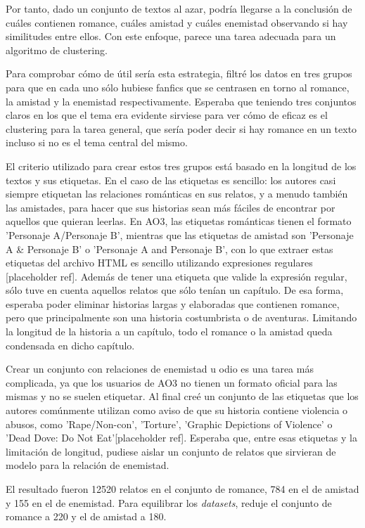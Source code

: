 \documentclass{pre-tfg}
\newcommand{\refToFilterCode}{[placeholder ref]}
\begin{document}
Por tanto, dado un conjunto de textos al azar, podría llegarse a la conclusión de cuáles contienen romance, cuáles amistad y cuáles enemistad observando si hay similitudes entre ellos. Con este enfoque, parece una tarea adecuada para un algoritmo de clustering.

Para comprobar cómo de útil sería esta estrategia, filtré los datos en tres grupos para que en cada uno sólo hubiese fanfics que se centrasen en torno al romance, la amistad y la enemistad respectivamente. Esperaba que teniendo tres conjuntos claros en los que el tema era evidente sirviese para ver cómo de eficaz es el clustering para la tarea general, que sería poder decir si hay romance en un texto incluso si no es el tema central del mismo.

El criterio utilizado para crear estos tres grupos está basado en la longitud de los textos y sus etiquetas. En el caso de las etiquetas es sencillo: los autores casi siempre etiquetan las relaciones románticas en sus relatos, y a menudo también las amistades, para hacer que sus historias sean más fáciles de encontrar por aquellos que quieran leerlas. En AO3, las etiquetas románticas tienen el formato 'Personaje A/Personaje B', mientras que las etiquetas de amistad son 'Personaje A \& Personaje B' o 'Personaje A and  Personaje B', con lo que extraer estas etiquetas del archivo HTML es sencillo utilizando expresiones regulares \refToFilterCode. Además de tener una etiqueta que valide la expresión regular, sólo tuve en cuenta aquellos relatos que sólo tenían un capítulo. De esa forma, esperaba poder eliminar historias largas y elaboradas que contienen romance, pero que principalmente son una historia costumbrista o de aventuras. Limitando la longitud de la historia a un capítulo, todo el romance o la amistad queda condensada en dicho capítulo.

Crear un conjunto con relaciones de enemistad u odio es una tarea más complicada, ya que los usuarios de AO3 no tienen un formato oficial para las mismas y no se suelen etiquetar. Al final creé un conjunto de las etiquetas que los autores comúnmente utilizan como aviso de que su historia contiene violencia o abusos, como 'Rape/Non-con', 'Torture', 'Graphic Depictions of Violence' o 'Dead Dove: Do Not Eat'\refToFilterCode . Esperaba que, entre esas etiquetas y la limitación de longitud, pudiese aislar un conjunto de relatos que sirvieran de modelo para la relación de enemistad.

El resultado fueron 12520 relatos en el conjunto de romance, 784 en el de amistad y 155 en el de enemistad. Para equilibrar los \textit{datasets}, reduje el conjunto de romance a 220 y el de amistad a 180.
\end{document}
